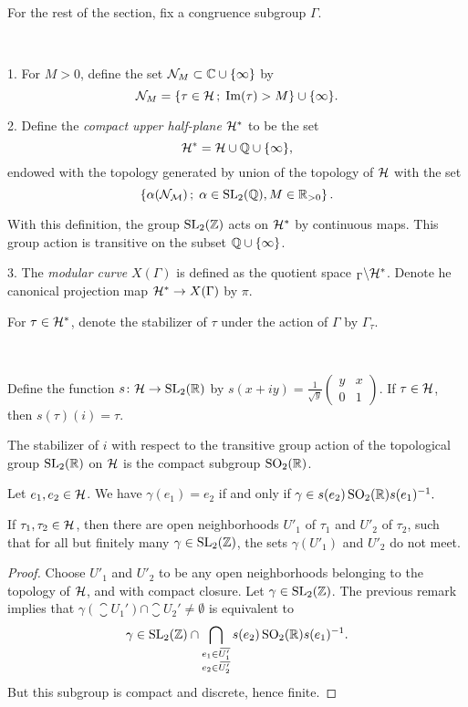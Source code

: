 For the rest of the section, fix a congruence subgroup $\Gamma$.

\begin{defi} \ 

  1. For $M>0$, define the set $\mathcal{N}_M \subset \mathbb{C}\cup\{\infty\}$ by
  \[\mathcal{N}_M=\left\{\tau\in\mathcal{H}\,;\; \operatorname{Im}(\tau)>M\right\}\cup\{\infty\}.\]

  2. Define the \emph{compact upper half-plane} $\mathcal{H}^*$ to be the set
  \[\mathcal{H}^*=\mathcal{H}\cup\mathbb{Q}\cup\{\infty\},\]
  endowed with the topology generated by union of the topology of $\mathcal{H}$ with the set
  \[\left\{\alpha(\mathcal{N_M})\,;\; \alpha\in\operatorname{SL}_2(\mathbb{Q}), M\in\mathbb{R}_{>0}\right\}.\]

  With this definition, the group $\operatorname{SL}_2(\mathbb{Z})$ acts on $\mathcal{H}^*$ by continuous maps. This group action is transitive on the subset $\mathbb{Q}\cup\{\infty\}$.

  3. The \emph{modular curve} $X(\Gamma)$ is defined as the quotient space $_\Gamma\backslash\mathcal{H}^*$. Denote he canonical projection map $\mathcal{H}^*\to X(\Gamma)$ by $\pi$.
\end{defi}

For $\tau\in\mathcal{H}^*$, denote the stabilizer of $\tau$ under the action of $\Gamma$ by $\Gamma_\tau$.

\begin{rmk}\label{pr:real-op} \ 

  Define the function $s\colon\mathcal{H}\to\operatorname{SL}_2(\mathbb{R})$ by $s(x+iy)=\frac{1}{\sqrt{y}}\left(\begin{smallmatrix}y & x \\ 0 & 1\end{smallmatrix}\right)$. If $\tau\in\mathcal{H}$, then $s(\tau)(i)=\tau$.
 
  The stabilizer of $i$ with respect to the transitive group action of the topological group $\operatorname{SL}_2(\mathbb{R})$ on $\mathcal{H}$ is the compact subgroup $\operatorname{SO}_2(\mathbb{R})$.
 
  Let $e_1,e_2\in\mathcal{H}$. We have $\gamma(e_1)=e_2$ if and only if $\gamma\in s(e_2)\operatorname{SO}_2(\mathbb{R})s(e_1)^{-1}.$
\end{rmk}

\begin{prop}
 If $\tau_1, \tau_2\in\mathcal{H}$, then there are open neighborhoods $U'_1$ of $\tau_1$ and $U'_2$ of $\tau_2$, such that for all but finitely many $\gamma\in\operatorname{SL}_2(\mathbb{Z})$, the sets $\gamma(U'_1)$ and $U'_2$ do not meet.
\end{prop}

\begin{proof}
 Choose $U'_1$ and $U'_2$ to be any open neighborhoods belonging to the topology of $\mathcal{H}$, and with compact closure. Let $\gamma\in\operatorname{SL}_2(\mathbb{Z})$. The previous remark implies that $\gamma(\closure{U_1'})\cap\closure{U_2'}\neq\emptyset$ is equivalent to \[\gamma \in \operatorname{SL}_2(\mathbb{Z}) \cap \bigcap_{\substack{e_1\in{}\mkern3mu\overline{\mkern-3muU_1'}\\e_2\in{}\mkern3mu\overline{\mkern-3muU_2'}}}s(e_2)\operatorname{SO}_2(\mathbb{R})s(e_1)^{-1}.\] But this subgroup is compact and discrete, hence finite.
\end{proof}

